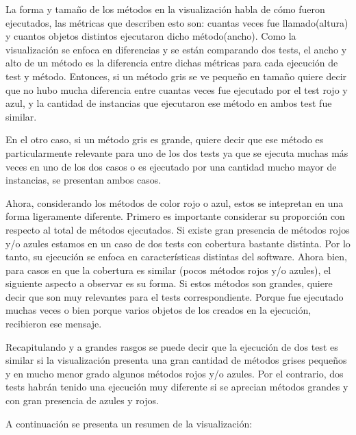 \par La forma y tamaño de los métodos en la visualización habla de cómo fueron ejecutados, las métricas que describen esto son: cuantas veces fue llamado(altura) y cuantos objetos distintos ejecutaron dicho método(ancho). Como la visualización se enfoca en diferencias y se están comparando dos tests, el ancho y alto de un método es la diferencia entre dichas métricas para cada ejecución de test y método. Entonces, si un método gris se ve pequeño en tamaño quiere decir que no hubo mucha diferencia entre cuantas veces fue ejecutado por el test rojo y azul, y la cantidad de instancias que ejecutaron ese método en ambos test fue similar. 

\par En el otro caso, si un método gris es grande, quiere decir que ese método es particularmente relevante para uno de los dos tests ya que se ejecuta muchas más veces en uno de los dos casos o es ejecutado por una cantidad mucho mayor de instancias, se presentan ambos casos. 

\par Ahora, considerando los métodos de color rojo o azul, estos se intepretan en una forma ligeramente diferente. Primero es importante considerar su proporción con respecto al total de métodos ejecutados. Si existe gran presencia de métodos rojos y/o azules estamos en un caso de dos tests con cobertura bastante distinta. Por lo tanto, su ejecución se enfoca en características distintas del software. Ahora bien, para casos en que la cobertura es similar (pocos métodos rojos y/o azules), el siguiente aspecto a observar es su forma. Si estos métodos son grandes, quiere decir que son muy relevantes para el tests correspondiente. Porque fue ejecutado muchas veces o bien porque varios objetos de los creados en la ejecución, recibieron ese mensaje.

\par Recapitulando y a grandes rasgos se puede decir que la ejecución de dos test es similar si la visualización presenta una gran cantidad de métodos grises pequeños y en mucho menor grado algunos métodos rojos y/o azules. Por el contrario, dos tests habrán tenido una ejecución muy diferente si se aprecian métodos grandes y con gran presencia de azules y rojos. 

\par A continuación se presenta un resumen de la visualización:

